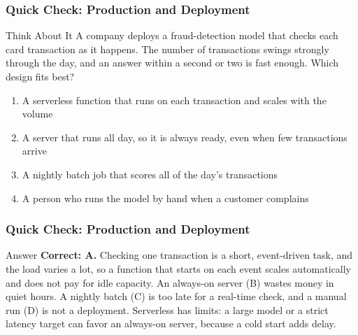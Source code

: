 \begin{frame}[fragile]\frametitle{Quick Check: Production and Deployment}
\begin{block}{Think About It}
A company deploys a fraud-detection model that checks each card transaction as it happens. The number of transactions swings strongly through the day, and an answer within a second or two is fast enough. Which design fits best?
\begin{enumerate}
  \item[A.] A serverless function that runs on each transaction and scales with the volume
  \item[B.] A server that runs all day, so it is always ready, even when few transactions arrive
  \item[C.] A nightly batch job that scores all of the day's transactions
  \item[D.] A person who runs the model by hand when a customer complains
\end{enumerate}
\end{block}
\end{frame}

\begin{frame}[fragile]\frametitle{Quick Check: Production and Deployment}
\begin{block}{Answer}
\textbf{Correct: A.} Checking one transaction is a short, event-driven task, and the load varies a lot, so a function that starts on each event scales automatically and does not pay for idle capacity. An always-on server (B) wastes money in quiet hours. A nightly batch (C) is too late for a real-time check, and a manual run (D) is not a deployment. Serverless has limits: a large model or a strict latency target can favor an always-on server, because a cold start adds delay.
\end{block}
\end{frame}

